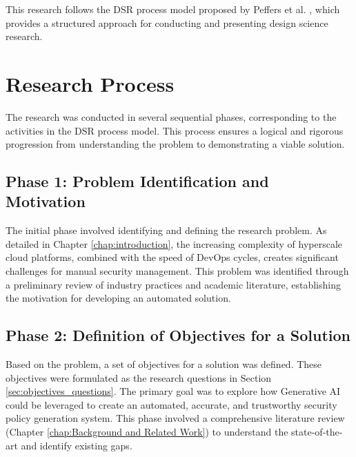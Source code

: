 This research follows the DSR process model proposed by Peffers et al. \cite{peffers_design_2007}, which provides a structured approach for conducting and presenting design science research.

\section{Research Process}
\label{sec:research_process}

The research was conducted in several sequential phases, corresponding to the activities in the DSR process model. This process ensures a logical and rigorous progression from understanding the problem to demonstrating a viable solution.

\subsection{Phase 1: Problem Identification and Motivation}
\label{subsec:problem_identification}
The initial phase involved identifying and defining the research problem. As detailed in Chapter \ref{chap:introduction}, the increasing complexity of hyperscale cloud platforms, combined with the speed of DevOps cycles, creates significant challenges for manual security management. This problem was identified through a preliminary review of industry practices and academic literature, establishing the motivation for developing an automated solution.

\subsection{Phase 2: Definition of Objectives for a Solution}
\label{subsec:objectives_definition}
Based on the problem, a set of objectives for a solution was defined. These objectives were formulated as the research questions in Section \ref{sec:objectives_questions}. The primary goal was to explore how Generative AI could be leveraged to create an automated, accurate, and trustworthy security policy generation system. This phase involved a comprehensive literature review (Chapter \ref{chap:Background and Related Work}) to understand the state-of-the-art and identify existing gaps.

